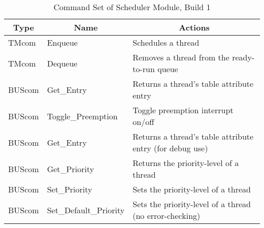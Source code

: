 \begin{table}
\caption{\label{tab:commands1}Command Set of Scheduler Module, Build 1}
\centering
\begin{tabular}{llp{3.0in}}
\hline
\multicolumn{1}{c}{\textbf{Type}} &
\multicolumn{1}{c}{\textbf{Name}} &
\multicolumn{1}{c}{\textbf{Actions}} \\
\hline
TMcom	&	Enqueue				& Schedules a thread\\
TMcom	&	Dequeue				& Removes a thread from the ready-to-run queue	\\
BUScom	&	Get\_Entry     		& Returns a thread's table attribute entry		\\
BUScom	&	Toggle\_Preemption	& Toggle preemption interrupt on/off	\\
BUScom	&	Get\_Entry     		& Returns a thread's table attribute entry (for debug use)		\\
BUScom	&	Get\_Priority		& Returns the priority-level of a thread	\\
BUScom	&	Set\_Priority		& Sets the priority-level of a thread\\
BUScom	&	Set\_Default\_Priority		& Sets the priority-level of a thread (no error-checking)\\
\hline
\end{tabular}
\end{table}

